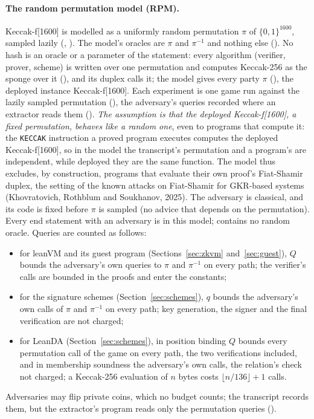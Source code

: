 \documentclass[11pt]{article}
\begin{document}
\paragraph{The random permutation model (RPM).} Keccak-f[1600] is modelled as a uniformly random
permutation $\pi$ of $\{0,1\}^{1600}$, sampled lazily (,
). The model's oracles are $\pi$ and $\pi^{-1}$ and
nothing else (). No hash is an oracle or a parameter of
the statement: every algorithm (verifier, prover, scheme) is written over one
permutation and computes Keccak-256 as the sponge over it (), and its duplex
calls it; the model gives every party $\pi$ (), the deployed
instance Keccak-f[1600]. Each experiment is one game run against the lazily sampled permutation
(), the adversary's queries recorded where an extractor reads
them (). \emph{The assumption is that the
deployed Keccak-f[1600], a fixed permutation, behaves like a random one}, even to programs that
compute it: the \texttt{KECCAK} instruction a proved program executes computes the deployed
Keccak-f[1600], so in the model the transcript's permutation and a program's are independent,
while deployed they are the same function. The model thus excludes, by construction, programs that
evaluate their own proof's Fiat-Shamir duplex, the setting of the known attacks on Fiat-Shamir
for GKR-based systems (Khovratovich, Rothblum and Soukhanov, 2025). The adversary is classical,
and its code is fixed before $\pi$ is sampled (no advice that depends on the permutation). Every end statement with
an adversary is in this model;  contains no random oracle. Queries are counted as
follows:
\begin{itemize}
\item for leanVM and its guest program (Sections~\ref{sec:zkvm} and~\ref{sec:guest}), $Q$ bounds
the adversary's own queries to $\pi$ and $\pi^{-1}$ on every path; the verifier's calls are bounded
in the proofs and enter the constants;
\item for the signature schemes (Section~\ref{sec:schemes}), $q$ bounds the adversary's own calls
of $\pi$ and $\pi^{-1}$ on every path; key generation, the signer and the final verification are
not charged;
\item for LeanDA (Section~\ref{sec:schemes}), in position binding $Q$ bounds every permutation call of the game on every path, the two verifications included, and in membership soundness the adversary's own calls, the relation's check not charged; a Keccak-256 evaluation of $n$ bytes costs $\lfloor n/136\rfloor + 1$ calls.
\end{itemize}
Adversaries may flip private coins, which no budget counts; the transcript records them, but the extractor's program reads only the permutation queries ().
\end{document}
